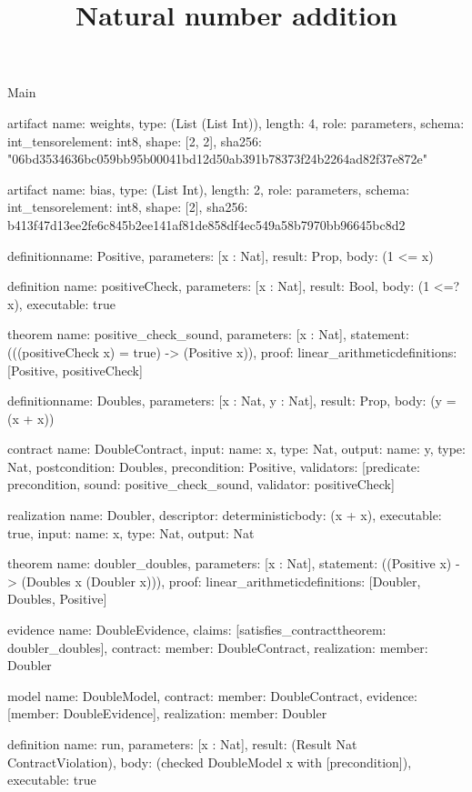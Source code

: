 \begin{lexlean}{Main}
\title{Natural number addition}
\begin{semanticmodule}
artifact{
  name: weights,
  type: (List (List Int)),
  length: 4,
  role: parameters,
  schema: int_tensor{element: int8, shape: [2, 2]},
  sha256: "06bd3534636bc059bb95b00041bd12d50ab391b78373f24b2264ad82f37e872e"
}

artifact{
  name: bias,
  type: (List Int),
  length: 2,
  role: parameters,
  schema: int_tensor{element: int8, shape: [2]},
  sha256: b413f47d13ee2fe6c845b2ee141af81de858df4ec549a58b7970bb96645bc8d2
}

definition{name: Positive, parameters: [x : Nat], result: Prop, body: (1 <= x)}

definition{
  name: positiveCheck,
  parameters: [x : Nat],
  result: Bool,
  body: (1 <=? x),
  executable: true
}

theorem{
  name: positive_check_sound,
  parameters: [x : Nat],
  statement: (((positiveCheck x) = true) -> (Positive x)),
  proof: linear_arithmetic{definitions: [Positive, positiveCheck]}
}

definition{name: Doubles, parameters: [x : Nat, y : Nat], result: Prop, body: (y = (x + x))}

contract{
  name: DoubleContract,
  input: {name: x, type: Nat},
  output: {name: y, type: Nat},
  postcondition: Doubles,
  precondition: Positive,
  validators: [{predicate: precondition, sound: positive_check_sound, validator: positiveCheck}]
}

realization{
  name: Doubler,
  descriptor: deterministic{body: (x + x)},
  executable: true,
  input: {name: x, type: Nat},
  output: Nat
}

theorem{
  name: doubler_doubles,
  parameters: [x : Nat],
  statement: ((Positive x) -> (Doubles x (Doubler x))),
  proof: linear_arithmetic{definitions: [Doubler, Doubles, Positive]}
}

evidence{
  name: DoubleEvidence,
  claims: [satisfies_contract{theorem: doubler_doubles}],
  contract: {member: DoubleContract},
  realization: {member: Doubler}
}

model{
  name: DoubleModel,
  contract: {member: DoubleContract},
  evidence: [{member: DoubleEvidence}],
  realization: {member: Doubler}
}

definition{
  name: run,
  parameters: [x : Nat],
  result: (Result Nat ContractViolation),
  body: (checked DoubleModel x with [precondition]),
  executable: true
}


\end{semanticmodule}
\end{lexlean}

